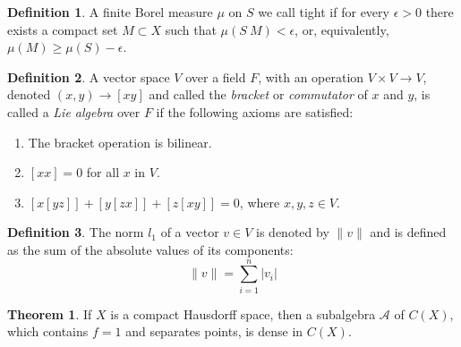\documentclass[12pt,a4paper]{report}
\theoremstyle{definition}
\newtheorem{theorem}{Theorem}
\newtheorem{definition}{Definition}
\begin{document}
\begin{appendix}
\begin{definition}\parencite{billingsley1968convergence}
	A finite Borel measure $\mu$ on $S$ we call tight if for every $\epsilon > 0$ there exists a compact set $M \subset X$ such that $\mu(S \ M) < \epsilon$, or, equivalently, $\mu(M) \geq \mu(S)-\epsilon$.
\end{definition}

\begin{definition}
	A vector space $V$ over a field $F$, with an operation $V\times V \rightarrow V$, denoted $(x, y) \rightarrow [xy]$ and called the \textit{bracket} or \textit{commutator} of $x$ and $y$, is called a \textit{Lie algebra} over $F$ if the following axioms are satisfied:
	\begin{enumerate}
		\item The bracket operation is bilinear.
		\item 	$[xx] = 0$ for all $x$ in $V$.
		\item $[x[yz]] + [y[zx]]+ [z[xy]] = 0$, where $x, y, z \in V.$ 
	\end{enumerate}
\end{definition}




\begin{definition}
	The norm $l_1$ of a vector $v\in V$ is denoted by $\|v\|$ and is defined as the sum of the absolute values of its components:
	\begin{equation}
		\|v \|=\sum_{i=1}^{n} |v_i|
	\end{equation}	
\end{definition}

\begin{theorem}\parencite[see][Stone-Weierstrass theorem]{borwein1995polynomials}
	If $X$ is a compact Hausdorff space, then a subalgebra $\mathcal{A}$ of $C(X)$, which contains $f=1$ and separates points, is dense in $C(X)$.
\end{theorem}


\end{appendix}
\end{document}
